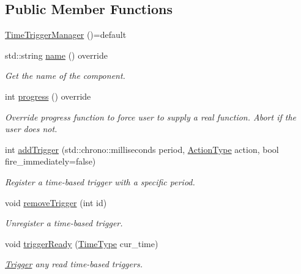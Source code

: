 \subsection*{Public Member Functions}
\begin{DoxyCompactItemize}
\item 
\hyperlink{structvt_1_1timetrigger_1_1_time_trigger_manager_a5739a97e0a8c7a19943d030a04e63a35}{Time\+Trigger\+Manager} ()=default
\item 
std\+::string \hyperlink{structvt_1_1timetrigger_1_1_time_trigger_manager_a8eba6c4f2596f9f8a6ad374ac020c8f4}{name} () override
\begin{DoxyCompactList}\small\item\em Get the name of the component. \end{DoxyCompactList}\item 
int \hyperlink{structvt_1_1timetrigger_1_1_time_trigger_manager_aa2d7955644dc9a1be6e813819b69f711}{progress} () override
\begin{DoxyCompactList}\small\item\em Override progress function to force user to supply a real function. Abort if the user does not. \end{DoxyCompactList}\item 
int \hyperlink{structvt_1_1timetrigger_1_1_time_trigger_manager_ac45c3677529eb6311e1823ac92829a7c}{add\+Trigger} (std\+::chrono\+::milliseconds period, \hyperlink{namespacevt_ae0a5a7b18cc99d7b732cb4d44f46b0f3}{Action\+Type} action, bool fire\+\_\+immediately=false)
\begin{DoxyCompactList}\small\item\em Register a time-\/based trigger with a specific period. \end{DoxyCompactList}\item 
void \hyperlink{structvt_1_1timetrigger_1_1_time_trigger_manager_ae6bdddd787aa88b714686270587e1ff5}{remove\+Trigger} (int id)
\begin{DoxyCompactList}\small\item\em Unregister a time-\/based trigger. \end{DoxyCompactList}\item 
void \hyperlink{structvt_1_1timetrigger_1_1_time_trigger_manager_a57c2be01d872ed68e2261786468e3979}{trigger\+Ready} (\hyperlink{namespacevt_a876a9d0cd5a952859c72de8a46881442}{Time\+Type} cur\+\_\+time)
\begin{DoxyCompactList}\small\item\em \hyperlink{structvt_1_1timetrigger_1_1_trigger}{Trigger} any read time-\/based triggers. \end{DoxyCompactList}\end{DoxyCompactItemize}

